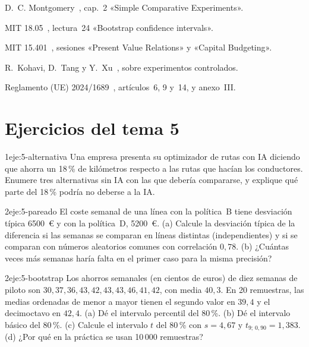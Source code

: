 \begin{lecturas}
\item D.~C. Montgomery~\cite{montgomery}, cap.~2 «Simple Comparative Experiments».
\item MIT 18.05~\cite{mit1805}, lectura~24 «Bootstrap confidence intervals».
\item MIT 15.401~\cite{mit15401}, sesiones «Present Value Relations» y «Capital Budgeting».
\item R.~Kohavi, D.~Tang y Y.~Xu~\cite{kohavi}, sobre experimentos controlados.
\item Reglamento (UE) 2024/1689~\cite{aiact}, artículos~6, 9 y~14, y anexo~III.
\end{lecturas}

\section*{Ejercicios del tema 5}

\begin{ejercicio}{1}{eje:5-alternativa}
Una empresa presenta su optimizador de rutas con IA diciendo que ahorra un 18\,\% de kilómetros respecto a las rutas que hacían los conductores. Enumere tres alternativas sin IA con las que debería compararse, y explique qué parte del 18\,\% podría no deberse a la IA.
\end{ejercicio}

\begin{ejercicio}{2}{eje:5-pareado}
El coste semanal de una línea con la política~B tiene desviación típica 6500~€ y con la política~D, 5200~€. (a) Calcule la desviación típica de la diferencia si las semanas se comparan en líneas distintas (independientes) y si se comparan con números aleatorios comunes con correlación $0{,}78$. (b) ¿Cuántas veces más semanas haría falta en el primer caso para la misma precisión?
\end{ejercicio}

\begin{ejercicio}{2}{eje:5-bootstrap}
Los ahorros semanales (en cientos de euros) de diez semanas de piloto son $30,37,36,43,42,43,43,46,41,42$, con media $40{,}3$. En 20 remuestras, las medias ordenadas de menor a mayor tienen el segundo valor en $39{,}4$ y el decimoctavo en $42{,}4$. (a) Dé el intervalo percentil del 80\,\%. (b) Dé el intervalo básico del 80\,\%. (c) Calcule el intervalo $t$ del 80\,\% con $s=4{,}67$ y $t_{9;\,0{,}90}=1{,}383$. (d) ¿Por qué en la práctica se usan 10\,000 remuestras?
\end{ejercicio}

